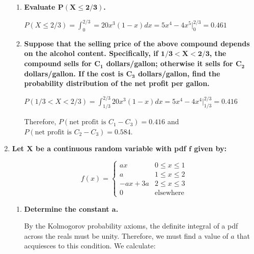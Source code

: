 \documentclass[10pt, oneside]{article}   	%
\theoremstyle{definition}
\begin{document}
\begin{enumerate}[label=4.\arabic*]
\begin{enumerate}
	\item  \begin{tcolorbox}[
	  colback=Cerulean!5!white,
	  colframe=Cerulean!75!black]
	\textbf{Evaluate $\bm{P(X \leq 2/3)}$.}
	\end{tcolorbox}
	
	$P(X \leq 2/3) = \int^{2/3}_0 = 20x^3 (1-x)dx = 5x^4 - 4x^5 \Big|^{2/3}_0 = \boxed{0.461}$
	
	\item  \begin{tcolorbox}[
	  colback=Cerulean!5!white,
	  colframe=Cerulean!75!black]
	\textbf{Suppose that the selling price of the above compound depends on the alcohol content. Specifically, if $\bm{1/3 < X < 2/3}$, the compound sells for $\bm{C_1}$ dollars/gallon; otherwise it sells for $\bm{C_2}$ dollars/gallon. If the cost is $\bm{C_3}$ dollars/gallon, find the probability distribution of the net profit per gallon.}
	\end{tcolorbox}
	
	$P(1/3 < X < 2/3) = \int^{2/3}_{1/3} 20x^3 (1-x)dx = 5x^4 - 4x^4 \Big|^{2/3}_{1/3} = \boxed{0.416}$
	
	Therefore, $P(\text{net profit is } C_1 - C_3) = \boxed{0.416}$ and $P(\text{net profit is } C_2 - C_3) = \boxed{0.584}$.
	\end{enumerate}

\item  \begin{tcolorbox}[
  colback=Cerulean!5!white,
  colframe=Cerulean!75!black]
\textbf{Let $\bm{X}$ be a continuous random variable with pdf $\bm{f}$ given by:}
\end{tcolorbox}

\[ f(x) = \begin{cases}
  ax  & 0 \leq x \leq 1 \\
  a & 1 \leq x \leq 2 \\
  -ax + 3a & 2 \leq x \leq 3 \\
  0 & \text{elsewhere}
\end{cases} \]

	\begin{enumerate}
	\item  \begin{tcolorbox}[
	  colback=Cerulean!5!white,
	  colframe=Cerulean!75!black]
	\textbf{Determine the constant $\bm{a}$.}
	\end{tcolorbox}
	
	By the Kolmogorov probability axioms, the definite integral of a pdf across the reals must be unity. Therefore, we must find a value of $a$ that acquiesces to this condition. We calculate:
	

\end{enumerate}
\end{enumerate}
\end{document}
